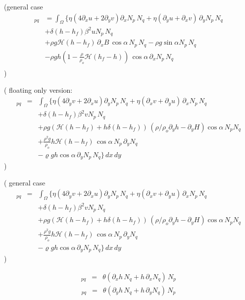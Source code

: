\documentclass[10pt,a4paper]{book}
\newcommand{\He}{\mathcal{H}}
\newcommand{\p}{\partial}
\begin{document}
(general case
\begin{align*}
[\mathrm{K}^{uh}]_{pq} 
&=\int_{\Omega} \big \{
\eta ( 4 \p_x u + 2 \p_y v) \p_x N_p \, N_q+ \eta (\p_y u + \p_x v) \, \p_y  N_p \, N_q \\
&  + \delta(h-h_f) \beta^2 u N_p \, N_q\\
& +   \rho g \He(h-h_f)  \, \p_x B \, \cos \alpha \, N_p \, N_q  -  \rho g \sin \alpha  N_p \,N_q   \\
& - \rho g h \left ( 1 - \frac{\rho}{\rho_o} \He(h_f-h)  \right ) \, \cos \alpha \, \p_x N_p \,  N_q    \\
\end{align*}
)


( floating only version:
\begin{eqnarray*}
[\mathrm{K}^{vh}]_{pq} 
&=&\int_{\Omega} \big \{
\eta ( 4 \p_y v + 2 \p_x u) \p_y N_p \, N_q+ \eta (\p_x v + \p_y u) \,\p_x  N_p \,N_q \\
& & + \delta(h-h_f) \beta^2 v N_p \, N_q\\
& & + \rho g ( \He(h-h_f) + h \delta(h-h_f)) \,( \rho /\rho_o \p_y h- \p_y H) \cos \alpha \, N_p N_q   \\
& & + \frac{\rho^2 g}{\rho_o}  h \He(h-h_f)  \, \cos \alpha \, N_p \, \p_y N_q    \\
& & -\varrho g h \cos \alpha \,\p_y N_p \, N_q \big \} \, dx \, dy
\end{eqnarray*}
)

( general case
\begin{eqnarray*}
[\mathrm{K}^{vh}]_{pq} 
&=&\int_{\Omega} \big \{
\eta ( 4 \p_y v + 2 \p_x u) \p_y N_p \, N_q+ \eta (\p_x v + \p_y u) \,\p_x  N_p \,N_q \\
& & + \delta(h-h_f) \beta^2 v N_p \, N_q\\
& & + \rho g ( \He(h-h_f) + h \delta(h-h_f)) \,( \rho /\rho_o \p_y h- \p_y H) \cos \alpha \, N_p N_q   \\
& & + \frac{\rho^2 g}{\rho_o}  h \He(h-h_f)  \, \cos \alpha \, N_p \, \p_y N_q    \\
& & -\varrho g h \cos \alpha \,\p_y N_p \, N_q \big \} \, dx \, dy
\end{eqnarray*}
)



\begin{eqnarray} 
[\mathrm{K}^{hu}]_{pq} &=& \theta (\p_x h \, N_q + h \, \p_x N_q )  \, N_p \nonumber 
\end{eqnarray}
\begin{eqnarray} 
[\mathrm{K}^{hv}]_{pq} &=& \theta (\p_y h \, N_q + h \, \p_y N_q ) \, N_p \nonumber 
\end{eqnarray}
\end{document}
